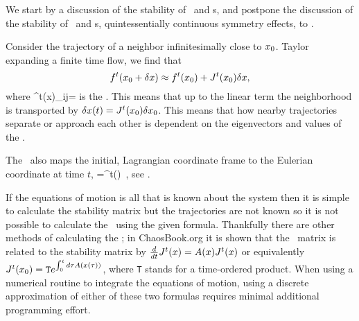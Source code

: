We start by a discussion of the stability of \eqva\ and \po s,
and postpone the discussion of the stability of \reqva\ and \rpo s,
quintessentially continuous symmetry effects, to .

Consider the trajectory of a  neighbor infinitesimally close
to ${x_0}$. Taylor expanding a finite time flow, we find that
\[
f^t({x_0} +\delta x) \approx f^t({x_0})+J^t({x_0})\delta x,
\]
where
\beq
\jMps^t(x)_{ij}=
 is
the \jacobianM. This means that up to the linear term the
neighborhood is transported by $\delta x(t)=J^t({x_0})\delta
{x_0}$. This means that how nearby trajectories separate or
approach each other is dependent on the eigenvectors and
values of the \jacobianM.

The \jacobianM\ also maps the initial, Lagrangian coordinate
frame to the Eulerian coordinate at time $t$,
\beq
{}=\jMps^t(\xInit) \velField{\xInit}
\,,
see .

If the equations of motion is all that is known about the
system then it is simple to calculate the stability matrix
but the trajectories are not known so it is not possible to
calculate the \jacobianM\ using the given formula. Thankfully
there are other methods of calculating the \jacobianM; in
ChaosBook.org it is shown that the \jacobianM\
matrix is related to the stability matrix by
$\frac{d}{dt} J^t(x)=A (x) J^t(x)$
or equivalently
$J^t({x_0})= \texttt{T} e^{\int^t_0 d\tau A (x(\tau))}$,
where \texttt{T} stands for a time-ordered product.
When using a numerical routine to integrate the equations of
motion, using a discrete approximation of either of these two
formulas requires minimal additional programming effort.



